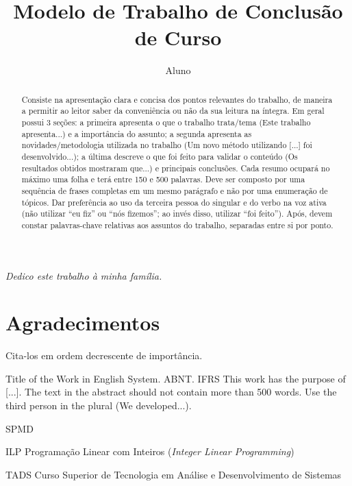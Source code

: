 \documentclass[openright]{ifrs} %
\author{Aluno}{Nome do}
\title{Modelo de Trabalho de Conclusão de Curso}
\begin{document}
\maketitle

\clearpage
\begin{flushright}
\mbox{}\vfill
{\sffamily\itshape
Dedico este trabalho à minha família.}
\end{flushright}

\chapter*{Agradecimentos}
Cita-los em ordem decrescente de importância.

\begin{abstract}
Consiste na apresentação clara e concisa dos pontos relevantes do trabalho, de maneira a permitir ao leitor saber da conveniência ou não da sua leitura na íntegra. Em geral possui 3 seções: a primeira apresenta o que o trabalho trata/tema (Este trabalho apresenta...) e a importância do assunto; a segunda apresenta as novidades/metodologia utilizada no trabalho (Um novo método utilizando [...] foi desenvolvido...); a última descreve o que foi feito para validar o conteúdo (Os resultados obtidos mostraram que...) e principais conclusões.  Cada resumo ocupará no máximo uma folha e terá entre 150 e 500 palavras. Deve ser composto por uma sequência de frases completas em um mesmo parágrafo e não por uma enumeração de tópicos. Dar preferência ao uso da terceira pessoa do singular e do verbo na voz ativa (não utilizar ``eu fiz'' ou ``nós fizemos''; ao invés disso, utilizar ``foi feito''). Após, devem constar palavras-chave relativas aos assuntos do trabalho, separadas entre si por ponto.  
 \end{abstract}

\begin{englishabstract}
{Title of the Work in English}
{System. ABNT. IFRS} %
This work has the purpose of [...]. The text in the abstract should not contain more than 500 words. Use the third person in the plural (We developed...).
\end{englishabstract}

\begin{listofabbrv}{SPMD}
        \item[ILP] Programação Linear com Inteiros (\textit{Integer Linear Programming})
        \item[TADS] Curso Superior de Tecnologia em Análise e Desenvolvimento de Sistemas
\end{listofabbrv}
\end{document}
